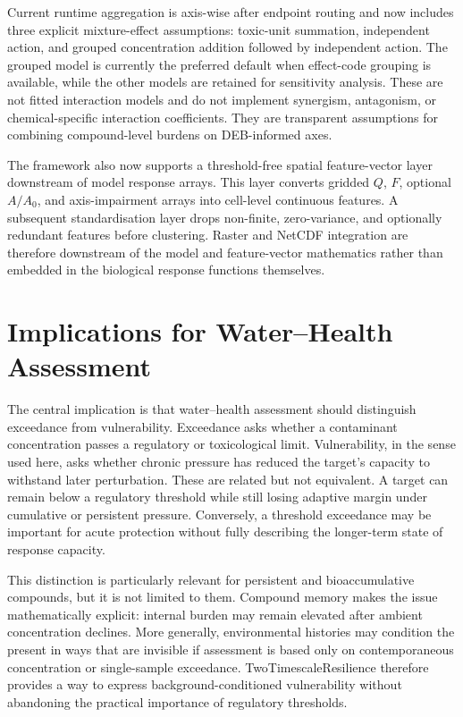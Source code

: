 Current runtime aggregation is axis-wise after endpoint routing and now includes three explicit mixture-effect assumptions: toxic-unit summation, independent action, and grouped concentration addition followed by independent action. The grouped model is currently the preferred default when effect-code grouping is available, while the other models are retained for sensitivity analysis. These are not fitted interaction models and do not implement synergism, antagonism, or chemical-specific interaction coefficients. They are transparent assumptions for combining compound-level burdens on DEB-informed axes.

The framework also now supports a threshold-free spatial feature-vector layer downstream of model response arrays. This layer converts gridded $Q$, $F$, optional $A/A_0$, and axis-impairment arrays into cell-level continuous features. A subsequent standardisation layer drops non-finite, zero-variance, and optionally redundant features before clustering. Raster and NetCDF integration are therefore downstream of the model and feature-vector mathematics rather than embedded in the biological response functions themselves.

\section{Implications for Water--Health Assessment}
\label{sec:implications}

The central implication is that water--health assessment should distinguish exceedance from vulnerability. Exceedance asks whether a contaminant concentration passes a regulatory or toxicological limit. Vulnerability, in the sense used here, asks whether chronic pressure has reduced the target's capacity to withstand later perturbation. These are related but not equivalent. A target can remain below a regulatory threshold while still losing adaptive margin under cumulative or persistent pressure. Conversely, a threshold exceedance may be important for acute protection without fully describing the longer-term state of response capacity.

This distinction is particularly relevant for persistent and bioaccumulative compounds, but it is not limited to them. Compound memory makes the issue mathematically explicit: internal burden may remain elevated after ambient concentration declines. More generally, environmental histories may condition the present in ways that are invisible if assessment is based only on contemporaneous concentration or single-sample exceedance. TwoTimescaleResilience therefore provides a way to express background-conditioned vulnerability without abandoning the practical importance of regulatory thresholds.

